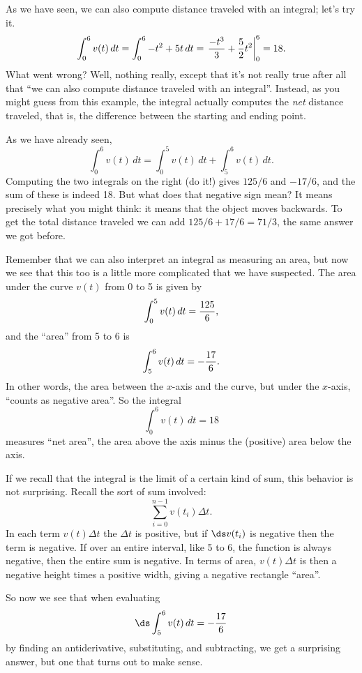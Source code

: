 As we have seen, we can also compute distance traveled with an
integral; let's try it.
$$
  \int_0^6 v(t)\,dt = \int_0^6 -t^2+5t\,dt = 
\left.{-t^3\over 3}+{5\over2}t^2\right|_0^6  = 
18.
$$
What went wrong? Well, nothing really, except that it's not really
true after all that ``we can also compute distance traveled with an
integral''. Instead, as you might guess from this example, the
integral actually computes the {\it net\/} distance traveled, that is,
the difference between the starting and ending point.

As we have already seen,
$$
  \int_0^6 v(t)\,dt=\int_0^5 v(t)\,dt+\int_5^6 v(t)\,dt.
$$
Computing the two integrals on the right (do it!) gives
$125/6$ and $-17/6$, and the sum of these is indeed 18. But what does
that negative sign mean? It means precisely what you might think: it
means that the object moves backwards. To get the total distance
traveled we can add $125/6+17/6=71/3$, the same answer we got before.

Remember that we can also interpret an integral as measuring an area,
but now we see that this too is a little more complicated that we have
suspected. The area under the curve $v(t)$ from 0 to 5 is given by 
$$
  \int_0^5 v(t)\,dt={125\over6},
$$
and the ``area'' from 5 to 6 is 
$$
  \int_5^6 v(t)\,dt=-{17\over 6}.
$$
In other words, the area between the $x$-axis and the curve, but under
the $x$-axis, ``counts as negative area''. So the integral
$$
  \int_0^6 v(t)\,dt=18
$$ 
measures ``net area'', the area above the axis minus the (positive)
area below the axis.

If we recall that the integral is the limit of a certain kind of sum,
this behavior is not surprising. Recall the sort of sum involved:
$$
  \sum_{i=0}^{n-1} v(t_i)\Delta t.
$$
In each term $v(t)\Delta t$ the $\Delta t$ is positive, but if
$\ds v(t_i)$ is negative then the term is negative. If over an entire
interval, like 5 to 6, the function is always negative, then the
entire sum is negative. In terms of area, $v(t)\Delta t$ is then a
negative height times a positive width, giving a negative rectangle
``area''. 

So now we see that when evaluating $$\ds\int_5^6 v(t)\,dt=-{17\over 6}$$
by finding an antiderivative, substituting, and subtracting, we get a
surprising answer, but one that turns out to make sense.

